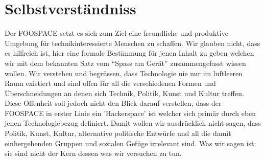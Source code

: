 \documentclass[10pt,a4paper]{article}
\begin{document}
\section*{Selbstverständniss}

Der FOOSPACE setzt es sich zum Ziel eine freundliche und produktive Umgebung
für technikinteressierte Menschen zu schaffen.  Wir glauben nicht, dass es
hilfreich ist, hier eine formale Bestimmung für jenen Inhalt zu geben welchen
wir mit dem bekannten Satz vom "`Spass am Gerät"' zusammengefasst wissen wollen.
Wir verstehen und begrüssen, dass Technologie nie nur im luftleeren Raum
existiert und sind offen für all die verschiedenen Formen und Überschneidungen
an denen sich Technik, Politik, Kunst und Kultur treffen.
Diese Offenheit soll jedoch nicht den Blick darauf verstellen, dass der FOOSPACE in
erster Linie ein 'Hackerspace' ist welcher sich primär durch eben
jenen Technologiebezug definiert.  Damit wollen wir ausdrücklich nicht sagen, dass
Politik, Kunst, Kultur, alternative politische Entwürfe und all die damit
einhergehenden Gruppen und sozialen Gefüge irrelevant sind. Was wir sagen ist:
sie sind nicht der Kern dessen was wir versuchen zu tun.
\end{document}
